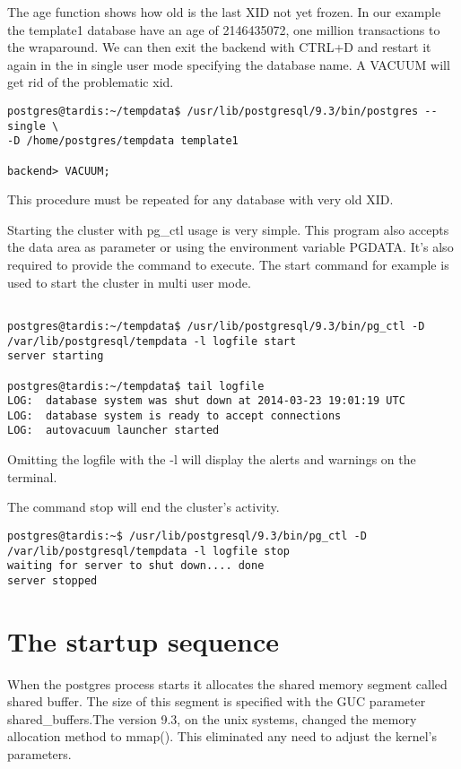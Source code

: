 The age function shows how old is the last XID not yet frozen. In our example the template1
database have an age of 2146435072, one million transactions to the wraparound. We can then exit 
the backend with CTRL+D and restart it again in the in single user mode specifying the database 
name. A VACUUM will get rid of the problematic xid.

\begin{verbatim}
postgres@tardis:~/tempdata$ /usr/lib/postgresql/9.3/bin/postgres --single \
-D /home/postgres/tempdata template1

backend> VACUUM;
\end{verbatim}

This procedure must be repeated for any database with very old XID.\newline

Starting the cluster with pg\_ctl usage is very simple. This program also accepts the data area as 
parameter or using the environment variable PGDATA. It's also required to provide the command to 
execute. The start command for example is used to start the cluster in multi user mode.

\begin{verbatim}

postgres@tardis:~/tempdata$ /usr/lib/postgresql/9.3/bin/pg_ctl -D 
/var/lib/postgresql/tempdata -l logfile start
server starting

postgres@tardis:~/tempdata$ tail logfile 
LOG:  database system was shut down at 2014-03-23 19:01:19 UTC
LOG:  database system is ready to accept connections
LOG:  autovacuum launcher started

\end{verbatim}
Omitting the logfile with the -l will display the alerts and warnings on the terminal.

The command stop will end the cluster's activity.

\begin{verbatim}
postgres@tardis:~$ /usr/lib/postgresql/9.3/bin/pg_ctl -D 
/var/lib/postgresql/tempdata -l logfile stop
waiting for server to shut down.... done
server stopped
\end{verbatim}

\section{The startup sequence}
\label{sec:STARTUP}

When the postgres process starts it allocates the shared memory segment called shared buffer. The
size of this segment is specified with the GUC parameter shared\_buffers.The version 9.3, on the
unix systems, changed the memory allocation method to mmap(). This eliminated any need to adjust
the kernel's parameters.

